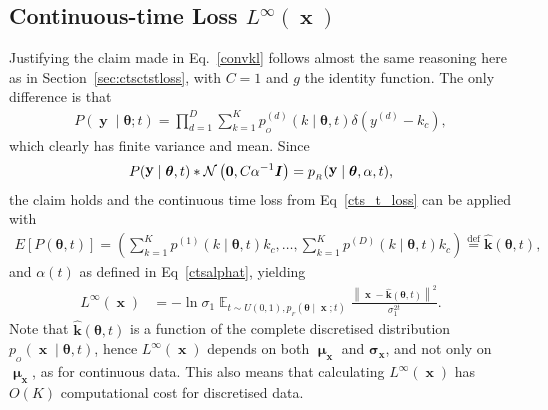 \documentclass[11pt,table]{article}
\DeclareMathOperator*{\E}{\mathbb{E}}
\DeclareMathOperator{\x}{\mathbf{x}}
\DeclareMathOperator{\y}{\mathbf{y}}
\DeclareMathOperator{\m}{\boldsymbol{\mu}}
\newcommand{\N}[2]{\mathcal{N}\left(#1 , #2\right)}
\newcommand{\bc}[1]{#1_c}
\newcommand{\I}[1]{\boldsymbol{I}}
\newcommand*{\defeq}{\stackrel{\text{def}}{=}}
\newcommand{\didx}[2]{#1^{(#2)}}
\renewcommand{\vec}[1]{\boldsymbol{#1}}
\newcommand{\pars}{\theta}
\newcommand{\parsn}{\vec{\pars}}
\newcommand{\0}[1]{\constvec{0}{#1}}
\newcommand{\1}[1]{\constvec{1}{#1}}
\newcommand{\yd}{y}
\newcommand{\ydd}[1]{\didx{\yd}{#1}}
\newcommand{\out}{p_{_O}}
\newcommand{\rec}{p_{_R}}
\newcommand{\flow}{p_{_F}}
\newcommand{\pred}[1]{\hat{#1}}
\begin{document}
\subsection{Continuous-time Loss \texorpdfstring{$L^{\infty}(\x)$}{}}
Justifying the claim made in Eq.~\ref{convkl} follows almost the same reasoning here as in Section~\ref{sec:ctsctstloss}, with $C=1$ and $g$ the identity function. 
The only difference is that
\begin{align}
P(\y \mid \parsn; t) = \prod_{d=1}^D \sum_{k=1}^K \out^{(d)}(k \mid \parsn, t) \delta(\ydd{d} - \bc{k}),
\end{align}
which clearly has finite variance and mean.
Since
\begin{align}
P(\y \mid \parsn, t) \ast \N{\0{D}}{C\alpha^{-1}\I{D}} = \rec(\y \mid \parsn, \alpha, t),
\end{align}
the claim holds and the continuous time loss from Eq~\ref{cts_t_loss} can be applied with
\begin{align}
E[P(\parsn, t)] = \left(\sum_{k=1}^K p^{(1)}(k \mid \parsn, t) k_c, \dots,\sum_{k=1}^K p^{(D)}(k \mid \parsn, t) k_c\right) \defeq \mathbf{\pred{k}}(\parsn, t),
\end{align}
and $\alpha(t)$ as defined in Eq~\ref{ctsalphat}, yielding
\begin{align}
L^{\infty}(\x) &= -\ln \sigma_1\E_{t \sim U(0,1), \flow(\parsn \mid \x; t)}  \frac{\left\|\x -\mathbf{\pred{k}}(\parsn, t) \right\|^2}{\sigma_1^{2t}}.
\end{align}
Note that $\mathbf{\pred{k}}(\parsn, t)$ is a function of the complete discretised distribution $\out(\x \mid \parsn, t)$, hence $L^{\infty}(\x)$ depends on both $\m_{\x}$ and $\vec{\sigma}_{\x}$, and not only on $\m_{\x}$, as for continuous data. This also means that calculating $L^{\infty}(\x)$ has $O(K)$ computational cost for discretised data.
\end{document}
